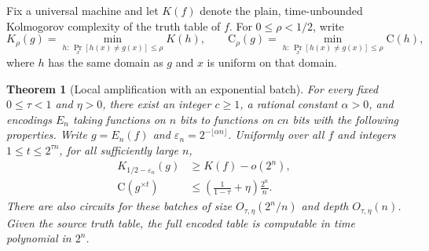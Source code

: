 \documentclass[11pt]{article}
\newtheorem{theorem}{Theorem}[section]
\newcommand{\C}{\mathrm{C}}
\begin{document}
Fix a universal machine and let $K(f)$ denote the plain, time-unbounded
Kolmogorov complexity of the truth table of $f$.  For $0\le\rho<1/2$, write
\[
 K_\rho(g)=\min_{h:\,\Pr_x[h(x)\ne g(x)]\le\rho}K(h),
 \qquad
 \C_\rho(g)=\min_{h:\,\Pr_x[h(x)\ne g(x)]\le\rho}\C(h),
\]
where $h$ has the same domain as $g$ and $x$ is uniform on that domain.

\begin{theorem}[Local amplification with an exponential batch]
\label{thm:amplification-batch}
For every fixed $0\le\tau<1$ and $\eta>0$, there exist an integer
$c\ge1$, a rational constant $\alpha>0$, and encodings $E_n$ taking
functions on $n$ bits to functions on $cn$ bits with the following
properties.  Write $g=E_n(f)$ and
$\varepsilon_n=2^{-\lfloor\alpha n\rfloor}$.  Uniformly over all $f$
and integers $1\le t\le2^{\tau n}$, for all sufficiently large $n$,
\begin{align}
 K_{1/2-\varepsilon_n}(g)&\ge K(f)-o(2^n),
       \label{eq:amplification-retention}\\
 \C(g^{\times t})&\le
    \left(\frac{1}{1-\tau}+\eta\right)\frac{2^n}{n}.
       \label{eq:amplification-batch-size}
\end{align}
There are also circuits for these batches of size
$O_{\tau,\eta}(2^n/n)$ and depth $O_{\tau,\eta}(n)$.
Given the source truth table, the full encoded table is computable
in time polynomial in $2^n$.
\end{theorem}
\end{document}
